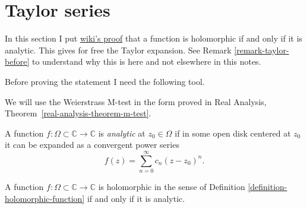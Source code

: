 \section{Taylor series}
\label{section-taylor}

\noindent
In this section I put
\href{https://en.wikipedia.org/wiki/%
Analyticity_of_holomorphic_functions}
{wiki's proof}
that a function is holomorphic if and only if
it is analytic.
This gives for free the Taylor expansion.
See Remark \ref{remark-taylor-before} to
understand why this is here
and not elsewhere in this notes.

\medskip\noindent
Before proving the statement I need the
following tool.

We will use the Weierstrass M-test in the form
proved in Real Analysis,
Theorem~\ref{real-analysis-theorem-m-test}.

\begin{definition}
\label{definition-analytic}
A function $f:\Omega \subset \mathbb{C} \to
\mathbb{C}$ is
{\it analytic} at $z_0 \in \Omega$ if in some
open disk centered at $z_0$
it can be expanded as a convergent power
series
$$
f(z)=\sum_{n=0}^\infty c_n(z-z_0)^n.
$$
\end{definition}

\begin{theorem}
\label{theorem-holomorphic-iff-analytic}
A function $f:\Omega \subset \mathbb{C} \to
\mathbb{C}$ is holomorphic
in the sense of Definition
\ref{definition-holomorphic-function}
if and only if it is analytic.
\end{theorem}

